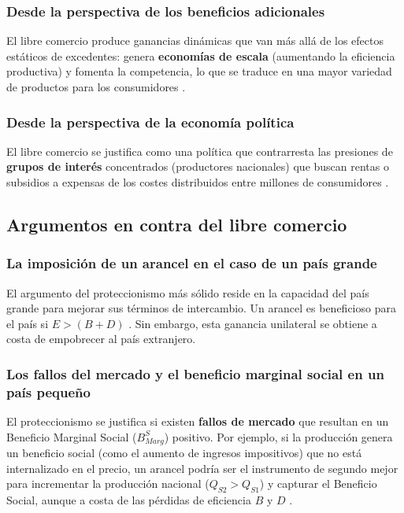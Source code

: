 \subsubsection{Desde la perspectiva de los beneficios adicionales}
El libre comercio produce ganancias dinámicas que van más allá de los efectos estáticos de excedentes: genera \textbf{economías de escala} (aumentando la eficiencia productiva) y fomenta la competencia, lo que se traduce en una mayor variedad de productos para los consumidores .

\subsubsection{Desde la perspectiva de la economía política}
El libre comercio se justifica como una política que contrarresta las presiones de \textbf{grupos de interés} concentrados (productores nacionales) que buscan rentas o subsidios a expensas de los costes distribuidos entre millones de consumidores .

\subsection{Argumentos en contra del libre comercio}

\subsubsection{La imposición de un arancel en el caso de un país grande}
El argumento del proteccionismo más sólido reside en la capacidad del país grande para mejorar sus términos de intercambio. Un arancel es beneficioso para el país si $E > (B+D)$ . Sin embargo, esta ganancia unilateral se obtiene a costa de empobrecer al país extranjero.

\subsubsection{Los fallos del mercado y el beneficio marginal social en un país pequeño}
El proteccionismo se justifica si existen \textbf{fallos de mercado} que resultan en un Beneficio Marginal Social ($B_{Marg}^S$) positivo. Por ejemplo, si la producción genera un beneficio social (como el aumento de ingresos impositivos) que no está internalizado en el precio, un arancel podría ser el instrumento de segundo mejor para incrementar la producción nacional ($Q_{S2} > Q_{S1}$) y capturar el Beneficio Social, aunque a costa de las pérdidas de eficiencia $B$ y $D$ .

